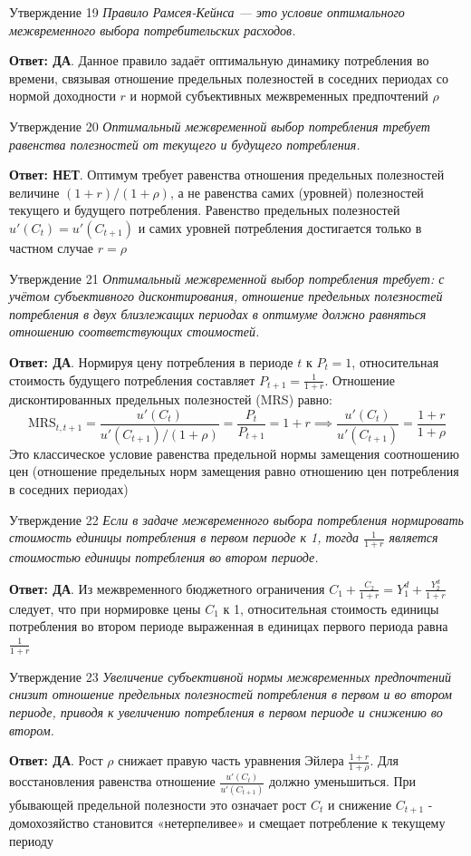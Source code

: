\documentclass[10pt,a4paper]{article}
\newcommand{\qda}{\textbf{\color{yesgreen}Ответ: ДА}}
\newcommand{\qnet}{\textbf{\color{nored}Ответ: НЕТ}}
\newenvironment{answer}[2]{%
  \begin{qbox}{Утверждение #1}
  \textit{#2}\par\smallskip
}{%
  \end{qbox}\vspace{2pt}
}
\begin{document}
\begin{answer}{19}{Правило Рамсея-Кейнса — это условие оптимального межвременного выбора потребительских расходов.}
\qda. Данное правило задаёт оптимальную динамику потребления во времени, связывая отношение предельных полезностей в соседних периодах со нормой доходности $r$ и нормой субъективных межвременных предпочтений $\rho$
\end{answer}

\begin{answer}{20}{Оптимальный межвременной выбор потребления требует равенства полезностей от текущего и будущего потребления.}
\qnet. Оптимум требует равенства отношения предельных полезностей величине $(1+r)/(1+\rho)$, а не равенства самих (уровней) полезностей текущего и будущего потребления. Равенство предельных полезностей $u'(C_t) = u'(C_{t+1})$ и самих уровней потребления достигается только в частном случае $r = \rho$
\end{answer}

\begin{answer}{21}{Оптимальный межвременной выбор потребления требует: с учётом субъективного дисконтирования, отношение предельных полезностей потребления в двух близлежащих периодах в оптимуме должно равняться отношению соответствующих стоимостей.}
\qda. Нормируя цену потребления в периоде $t$ к $P_t = 1$, относительная стоимость будущего потребления составляет $P_{t+1} = \frac{1}{1+r}$. Отношение дисконтированных предельных полезностей (MRS) равно:
\[
\text{MRS}_{t, t+1} = \frac{u'(C_t)}{u'(C_{t+1})/(1+\rho)} = \frac{P_t}{P_{t+1}} = 1+r \implies \frac{u'(C_t)}{u'(C_{t+1})} = \frac{1+r}{1+\rho}
\]
Это классическое условие равенства предельной нормы замещения соотношению цен (отношение предельных норм замещения равно отношению цен потребления в соседних периодах)
\end{answer}

\begin{answer}{22}{Если в задаче межвременного выбора потребления нормировать стоимость единицы потребления в первом периоде к 1, тогда $\frac{1}{1+r}$ является стоимостью единицы потребления во втором периоде.}
\qda. Из межвременного бюджетного ограничения $C_1 + \frac{C_2}{1+r} = Y_1^d + \frac{Y_2^d}{1+r}$ следует, что при нормировке цены $C_1$ к 1, относительная стоимость единицы потребления во втором периоде выраженная в единицах первого периода равна $\frac{1}{1+r}$
\end{answer}

\begin{answer}{23}{Увеличение субъективной нормы межвременных предпочтений снизит отношение предельных полезностей потребления в первом и во втором периоде, приводя к увеличению потребления в первом периоде и снижению во втором.}
\qda. Рост $\rho$ снижает правую часть уравнения Эйлера $\frac{1+r}{1+\rho}$. Для восстановления равенства отношение $\frac{u'(C_t)}{u'(C_{t+1})}$ должно уменьшиться. При убывающей предельной полезности это означает рост $C_t$ и снижение $C_{t+1}$ - домохозяйство становится «нетерпеливее» и смещает потребление к текущему периоду
\end{answer}
\end{document}
